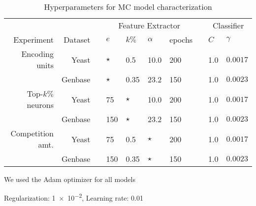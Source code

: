 \begin{table}[!h]
%
\centering
\begin{threeparttable}
\caption{Hyperparameters for MC model characterization}
%
\begin{tabular}{@{}rr*{8}{l}@{}}
\toprule
      &  && \multicolumn{4}{c}{Feature Extractor} &&
\multicolumn{2}{c}{Classifier} \\ \cmidrule{4-7} \cmidrule{9-10}
Experiment        & Dataset && $e$     & $k\%$ & $\alpha$ & epochs && $C$       & $\gamma$   \\\midrule
Encoding units    & Yeast   && $\star$ & 0.5   & 10.0     & 200    && \num{1.0} & $0.0017$   \\
                  & Genbase && $\star$ & 0.35  & 23.2     & 150    && \num{1.0} & $0.0023$   \\
Top-$k\%$ neurons & Yeast   && 75  & $\star$   & 10.0     & 200    && \num{1.0} & $0.0017$   \\
                  & Genbase && 150 & $\star$   & 23.2     & 150    && \num{1.0} & $0.0023$   \\
Competition amt.  & Yeast   && 75  &  0.5      & $\star$  & 200    && \num{1.0} & $0.0017$   \\
                  & Genbase && 150 &  0.35     & $\star$  & 150    && \num{1.0} & $0.0023$
\\\bottomrule
\end{tabular}
\begin{tablenotes}
\footnotesize
\item[1] We used the Adam optimizer for all models
\item[2] Regularization: \num{1e-2}, Learning rate: \num{0.01} 
\end{tablenotes}
\end{threeparttable}
\end{table}


